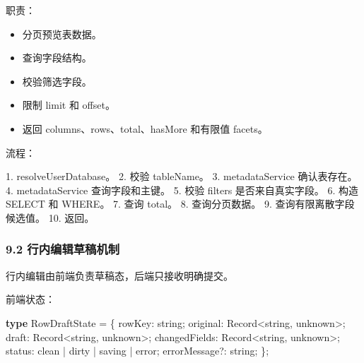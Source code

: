 \documentclass[
  a4paper,
  UTF8]{ctexart}
\newenvironment{Shaded}{}{}
\newcommand{\BuiltInTok}[1]{#1}
\newcommand{\DataTypeTok}[1]{\textcolor[rgb]{0.56,0.13,0.00}{#1}}
\newcommand{\KeywordTok}[1]{\textcolor[rgb]{0.00,0.44,0.13}{\textbf{#1}}}
\newcommand{\NormalTok}[1]{#1}
\newcommand{\OperatorTok}[1]{\textcolor[rgb]{0.40,0.40,0.40}{#1}}
\newcommand{\StringTok}[1]{\textcolor[rgb]{0.25,0.44,0.63}{#1}}
\providecommand{\tightlist}{%
  \setlength{\itemsep}{0pt}\setlength{\parskip}{0pt}}
\begin{document}
职责：

\begin{itemize}
\tightlist
\item
  分页预览表数据。
\item
  查询字段结构。
\item
  校验筛选字段。
\item
  限制 limit 和 offset。
\item
  返回 columns、rows、total、hasMore 和有限值 facets。
\end{itemize}

流程：

\begin{Shaded}
\begin{Highlighting}[]
\NormalTok{1. resolveUserDatabase。}
\NormalTok{2. 校验 tableName。}
\NormalTok{3. metadataService 确认表存在。}
\NormalTok{4. metadataService 查询字段和主键。}
\NormalTok{5. 校验 filters 是否来自真实字段。}
\NormalTok{6. 构造 SELECT 和 WHERE。}
\NormalTok{7. 查询 total。}
\NormalTok{8. 查询分页数据。}
\NormalTok{9. 查询有限离散字段候选值。}
\NormalTok{10. 返回。}
\end{Highlighting}
\end{Shaded}

\hypertarget{ux884cux5185ux7f16ux8f91ux8349ux7a3fux673aux5236}{%
\subsubsection{9.2
行内编辑草稿机制}\label{ux884cux5185ux7f16ux8f91ux8349ux7a3fux673aux5236}}

行内编辑由前端负责草稿态，后端只接收明确提交。

前端状态：

\begin{Shaded}
\begin{Highlighting}[]
\KeywordTok{type}\NormalTok{ RowDraftState }\OperatorTok{=}\NormalTok{ \{}
\NormalTok{  rowKey}\OperatorTok{:} \DataTypeTok{string}\OperatorTok{;}
\NormalTok{  original}\OperatorTok{:} \BuiltInTok{Record}\OperatorTok{\textless{}}\DataTypeTok{string}\OperatorTok{,} \DataTypeTok{unknown}\OperatorTok{\textgreater{};}
\NormalTok{  draft}\OperatorTok{:} \BuiltInTok{Record}\OperatorTok{\textless{}}\DataTypeTok{string}\OperatorTok{,} \DataTypeTok{unknown}\OperatorTok{\textgreater{};}
\NormalTok{  changedFields}\OperatorTok{:} \BuiltInTok{Record}\OperatorTok{\textless{}}\DataTypeTok{string}\OperatorTok{,} \DataTypeTok{unknown}\OperatorTok{\textgreater{};}
\NormalTok{  status}\OperatorTok{:} \StringTok{\textquotesingle{}clean\textquotesingle{}} \OperatorTok{|} \StringTok{\textquotesingle{}dirty\textquotesingle{}} \OperatorTok{|} \StringTok{\textquotesingle{}saving\textquotesingle{}} \OperatorTok{|} \StringTok{\textquotesingle{}error\textquotesingle{}}\OperatorTok{;}
\NormalTok{  errorMessage}\OperatorTok{?:} \DataTypeTok{string}\OperatorTok{;}
\NormalTok{\}}\OperatorTok{;}
\end{Highlighting}
\end{Shaded}
\end{document}
